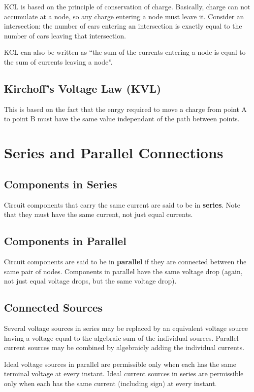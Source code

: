 \documentclass[12pt]{article}
\begin{document}
KCL is based on the principle of conservation of charge. Basically, charge can not accumulate at a node, so any charge entering a node must leave it. Consider an intersection: the number of cars entering an intersection is exactly equal to the number of cars leaving that intersection.

KCL can also be written as ``the sum of the currents entering a node is equal to the sum of currents leaving a node''.

\subsection*{Kirchoff's Voltage Law (KVL)}

This is based on the fact that the enrgy required to move a charge from point A to point B must have the same value independant of the path between points.

\section*{Series and Parallel Connections}
\subsection*{Components in Series}
Circuit components that carry the same current are said to be in {\bf series}. Note that they must have the same current, not just equal currents.

\subsection*{Components in Parallel}
Circuit components are said to be in {\bf parallel} if they are connected between the same pair of nodes. Components in parallel have the same voltage drop (again, not just equal voltage drops, but the same voltage drop).

\subsection*{Connected Sources}
Several voltage sources in series may be replaced by an equivalent voltage source having a voltage equal to the algebraic sum of the individual sources. Parallel current sources may be combined by algebraicly adding the individual currents.

Ideal voltage sources in parallel are permissible only when each has the same terminal voltage at every instant. Ideal current sources in series are permissible only when each has the same current (including sign) at every instant.
\end{document}
